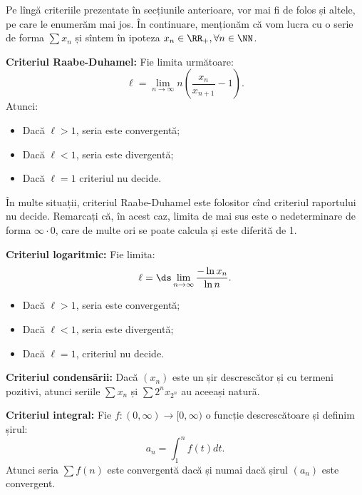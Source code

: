 Pe lîngă criteriile prezentate în secțiunile anterioare, vor mai fi de folos
și altele, pe care le enumerăm mai jos. În continuare, menționăm că
vom lucra cu o serie de forma $ \sum x_n $ și sîntem în ipoteza
$ x_n \in \RR_+, \forall n \in \NN $.

\textbf{Criteriul Raabe-Duhamel:} Fie limita următoare:
\[
    \ell = \lim_{n \to \infty} n \left( \dfrac{x_n}{x_{n+1}} - 1 \right).
\]
Atunci:
\begin{itemize}
    \item Dacă $ \ell > 1 $, seria este convergentă;
    \item Dacă $ \ell < 1 $, seria este divergentă;
    \item Dacă $ \ell = 1 $ criteriul nu decide.
\end{itemize}

În multe situații, criteriul Raabe-Duhamel este folositor cînd criteriul
raportului nu decide. Remarcați că, în acest caz, limita de mai sus
este o nedeterminare de forma $ \infty \cdot 0 $, care de multe ori
se poate calcula și este diferită de 1.

\vspace{1cm}

\textbf{Criteriul logaritmic:} Fie limita:
\[
  \ell = \ds\lim_{n \to \infty} \dfrac{- \ln x_n}{\ln n}.
\]
\begin{itemize}
    \item Dacă $ \ell > 1 $, seria este convergentă;
    \item Dacă $ \ell < 1 $, seria este divergentă;
    \item Dacă $ \ell = 1 $, criteriul nu decide.
\end{itemize}

\vspace{1cm}

\textbf{Criteriul condensării:} Dacă $ (x_n) $ este un șir
descrescător și cu termeni pozitivi, atunci seriile $ \sum x_n $ și
$ \sum 2^n x_{2^n} $ au aceeași natură.

\vspace{1cm}

\textbf{Criteriul integral:} Fie $ f : (0, \infty) \to [0, \infty) $ o funcție
descrescătoare și definim șirul:
\[
    a_n = \int_1^n f(t) dt.
\]
Atunci seria $ \sum f(n) $ este convergentă dacă și numai dacă șirul $ (a_n) $ este
convergent.

